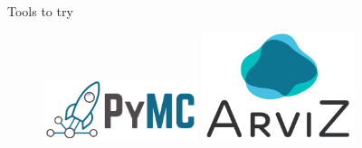 \documentclass[
aspectratio=169,
14pt,
professionalfonts
]{beamer}
\begin{document}
\begin{frame}{Tools to try}
\begin{figure}
    \href{
        https://www.pymc.io/
    }{\includegraphics[width=0.4\textwidth]{../plots/pymc.png}}
    \hfill
    \href{
        https://python.arviz.org/en/stable/
    }{\includegraphics[width=0.4\textwidth]{../plots/arviz.png}}
\end{figure}
\end{frame}






\appendix
\end{document}
